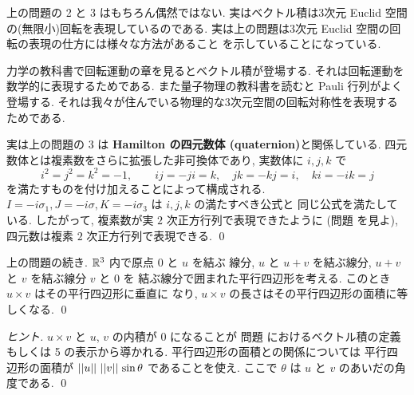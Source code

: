 \documentclass[12pt,twoside]{jarticle}
\begin{document}
\begin{guide}
  上の問題の 2 と 3 はもちろん偶然ではない.
  実はベクトル積は3次元 Euclid 空間の(無限小)回転を表現しているのである.
  実は上の問題は3次元 Euclid 空間の回転の表現の仕方には様々な方法があること
  を示していることになっている.

  力学の教科書で回転運動の章を見るとベクトル積が登場する.
  それは回転運動を数学的に表現するためである.
  また量子物理の教科書を読むと Pauli 行列がよく登場する.
  それは我々が住んでいる物理的な3次元空間の回転対称性を表現するためである.

  実は上の問題の 3 は {\bf Hamilton の四元数体 (quaternion)}と関係している.
  四元数体とは複素数をさらに拡張した非可換体であり, 実数体に $i,j,k$ で
  \begin{equation*}
    i^2=j^2=k^2=-1, \qquad ij=-ji=k, \quad jk=-kj=i, \quad ki=-ik=j    
  \end{equation*}
  を満たすものを付け加えることによって構成される. 
  $I=-i\sigma_1,J=-i\sigma,K=-i\sigma_3$ は $i,j,k$ の満たすべき公式と
  同じ公式を満たしている.
  したがって, 複素数が実 $2$ 次正方行列で表現できたように
  (問題  を見よ), 四元数は複素 $2$ 次正方行列で表現できる.
  \qed
\end{guide}


\begin{question}[ベクトル積と平行四辺形の面積, 15点]
  \label{q:|det|=vecArea}
  上の問題の続き. 
  ${\mathbb R}^3$ 内で原点 $0$ と $u$ を結ぶ
  線分, $u$ と $u+v$ を結ぶ線分, $u+v$ と $v$ を結ぶ線分 $v$ と $0$ を
  結ぶ線分で囲まれた平行四辺形を考える.
  このとき $u\times v$ はその平行四辺形に垂直に
  なり, $u\times v$ の長さはその平行四辺形の面積に等しくなる.
  \qed
\end{question}

\begin{proof}[ヒント]
  $u\times v$ と $u$, $v$ の内積が $0$ になることが
  問題  におけるベクトル積の定義もしくは 5 の表示から導かれる.
  平行四辺形の面積との関係については
  平行四辺形の面積が $\left|\left|u\right|\right|\,\left|\left|v\right|\right|\,\sin\theta$ であることを使え.
  ここで $\theta$ は $u$ と $v$ のあいだの角度である.
  \qed
\end{proof}

\end{document}
